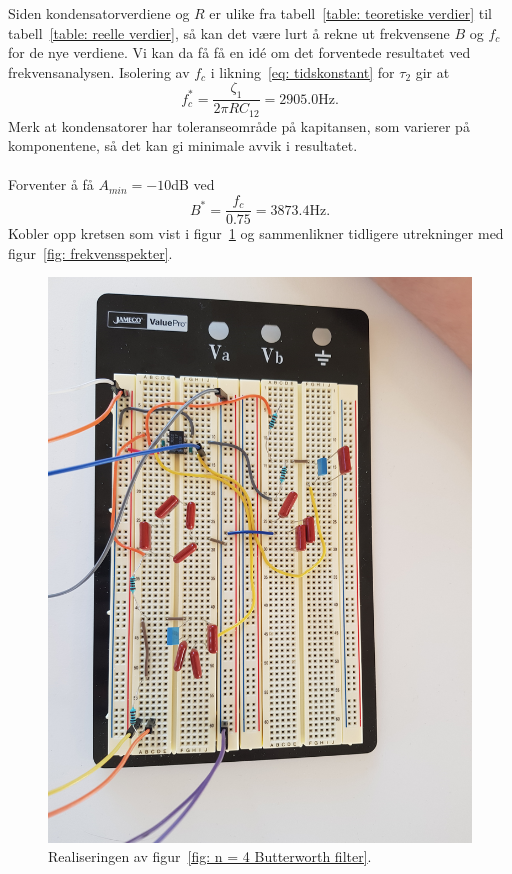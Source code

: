 \documentclass[a4paper,11pt,norsk]{article}
\begin{document}
Siden kondensatorverdiene og $R$ er ulike fra tabell~\ref{table: teoretiske verdier} til tabell~\ref{table: reelle verdier}, så kan det være lurt å rekne ut frekvensene $B$ og $f_c$ for de nye verdiene. Vi kan da få få en idé om det forventede resultatet ved frekvensanalysen.
Isolering av $f_c$ i likning~\ref{eq: tidskonstant} for $\tau_2$ gir at 
\begin{equation} \label{eq: f_c likning}
    f^*_c = \frac{\zeta_1}{2\pi R C_{12}} = 2905.0 \textrm{Hz}.
\end{equation}
Merk at kondensatorer har toleranseområde på kapitansen, som varierer på komponentene, så det kan gi minimale avvik i resultatet.\\\\
Forventer å få $A_{min} = -10$dB ved
\begin{equation}\label{eq: Båndbredde}
    B^* = \frac{f_c}{0.75} = 3873.4\textrm{Hz}.
\end{equation}
\newpage
Kobler opp kretsen som vist i figur~\ref{fig: realKrets} og sammenlikner tidligere utrekninger med figur~\ref{fig: frekvensspekter}.
\begin{figure}[htbp]
    \centering
    \includegraphics[width = 1.0 \textwidth]{img/RealKretsDp7.jpg}
    \caption{Realiseringen av figur~\ref{fig: n = 4 Butterworth filter}.}
    \label{fig: realKrets}
\end{figure} \\
\end{document}
